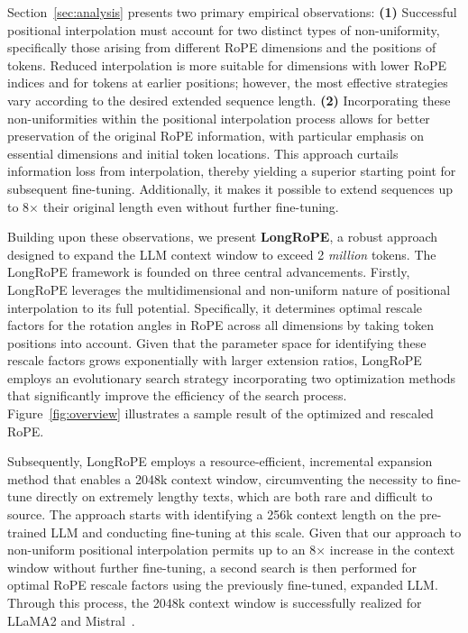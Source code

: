 Section~\ref{sec:analysis} presents two primary empirical observations: \textbf{(1)} Successful positional interpolation must account for two distinct types of non-uniformity, specifically those arising from different RoPE dimensions and the positions of tokens. Reduced interpolation is more suitable for dimensions with lower RoPE indices and for tokens at earlier positions; however, the most effective strategies vary according to the desired extended sequence length. \textbf{(2)} Incorporating these non-uniformities within the positional interpolation process allows for better preservation of the original RoPE information, with particular emphasis on essential dimensions and initial token locations. This approach curtails information loss from interpolation, thereby yielding a superior starting point for subsequent fine-tuning. Additionally, it makes it possible to extend sequences up to 8$\times$ their original length even without further fine-tuning.

Building upon these observations, we present \textbf{LongRoPE}, a robust approach designed to expand the LLM context window to exceed 2 \emph{million} tokens. The LongRoPE framework is founded on three central advancements. Firstly, {LongRoPE} leverages the multidimensional and non-uniform nature of positional interpolation to its full potential. Specifically, it determines optimal rescale factors for the rotation angles in RoPE across all dimensions by taking token positions into account. Given that the parameter space for identifying these rescale factors grows exponentially with larger extension ratios, {LongRoPE} employs an evolutionary search strategy incorporating two optimization methods that significantly improve the efficiency of the search process. Figure~\ref{fig:overview} illustrates a sample result of the optimized and rescaled RoPE.

Subsequently, {LongRoPE} employs a resource-efficient, incremental expansion method that enables a 2048k context window, circumventing the necessity to fine-tune directly on extremely lengthy texts, which are both rare and difficult to source. The approach starts with identifying a 256k context length on the pre-trained LLM and conducting fine-tuning at this scale. Given that our approach to non-uniform positional interpolation permits up to an 8$\times$ increase in the context window without further fine-tuning, a second search is then performed for optimal RoPE rescale factors using the previously fine-tuned, expanded LLM. Through this process, the 2048k context window is successfully realized for LLaMA2 and Mistral~\cite{mistral}.

